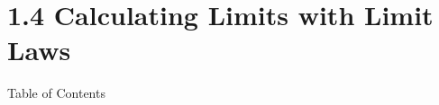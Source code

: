 
\section[1.4 Limit Laws]{1.4 Calculating Limits with Limit Laws}
 \begin{frame}{Table of Contents}
\mapofcontentsA{\ad}
 \end{frame}


